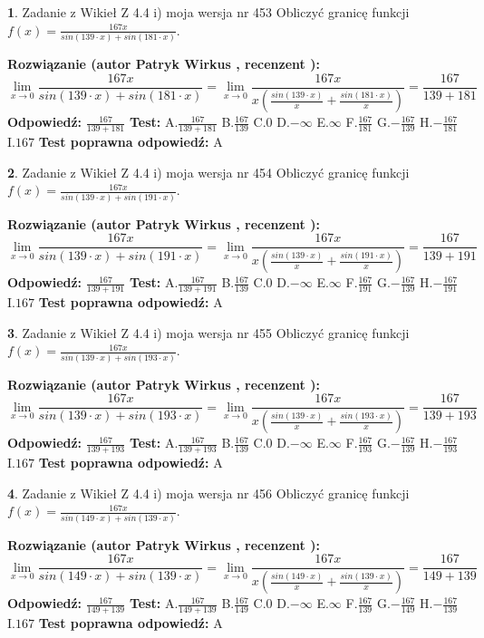 \documentclass[12pt, a4paper]{article}
\theoremstyle{definition} %
\newtheorem{zad}{}
\newcommand{\zadStart}[1]{\begin{zad}#1\newline}
\newcommand{\zadStop}{\end{zad}}
\newcommand{\rozwStart}[2]{\noindent \textbf{Rozwiązanie (autor #1 , recenzent #2): }\newline}
\newcommand{\rozwStop}{\newline}
\newcommand{\odpStart}{\noindent \textbf{Odpowiedź:}\newline}
\newcommand{\odpStop}{\newline}
\newcommand{\testStart}{\noindent \textbf{Test:}\newline}
\newcommand{\testStop}{\newline}
\newcommand{\kluczStart}{\noindent \textbf{Test poprawna odpowiedź:}\newline}
\newcommand{\kluczStop}{\newline}
\begin{document}
\zadStart{Zadanie z Wikieł Z 4.4 i) moja wersja nr 453}
Obliczyć granicę funkcji $f(x)=\frac{167x}{sin(139\cdot x) +sin(181\cdot x)}$.
\zadStop
\rozwStart{Patryk Wirkus}{}
$$\lim\limits_{x\to 0}\frac{167x}{sin(139\cdot x) +sin(181\cdot x)}=\lim\limits_{x\to 0}\frac{167x}{x(\frac{sin(139\cdot x)}{x}+\frac{sin(181\cdot x)}{x})}=\frac{167}{139+181}$$
\rozwStop
\odpStart
$\frac{167}{139+181}$
\odpStop
\testStart
A.$\frac{167}{139+181}$
B.$\frac{167}{139}$
C.$0$
D.$-\infty$
E.$\infty$
F.$\frac{167}{181}$
G.$-\frac{167}{139}$
H.$-\frac{167}{181}$
I.$167$
\testStop
\kluczStart
A
\kluczStop



\zadStart{Zadanie z Wikieł Z 4.4 i) moja wersja nr 454}
Obliczyć granicę funkcji $f(x)=\frac{167x}{sin(139\cdot x) +sin(191\cdot x)}$.
\zadStop
\rozwStart{Patryk Wirkus}{}
$$\lim\limits_{x\to 0}\frac{167x}{sin(139\cdot x) +sin(191\cdot x)}=\lim\limits_{x\to 0}\frac{167x}{x(\frac{sin(139\cdot x)}{x}+\frac{sin(191\cdot x)}{x})}=\frac{167}{139+191}$$
\rozwStop
\odpStart
$\frac{167}{139+191}$
\odpStop
\testStart
A.$\frac{167}{139+191}$
B.$\frac{167}{139}$
C.$0$
D.$-\infty$
E.$\infty$
F.$\frac{167}{191}$
G.$-\frac{167}{139}$
H.$-\frac{167}{191}$
I.$167$
\testStop
\kluczStart
A
\kluczStop



\zadStart{Zadanie z Wikieł Z 4.4 i) moja wersja nr 455}
Obliczyć granicę funkcji $f(x)=\frac{167x}{sin(139\cdot x) +sin(193\cdot x)}$.
\zadStop
\rozwStart{Patryk Wirkus}{}
$$\lim\limits_{x\to 0}\frac{167x}{sin(139\cdot x) +sin(193\cdot x)}=\lim\limits_{x\to 0}\frac{167x}{x(\frac{sin(139\cdot x)}{x}+\frac{sin(193\cdot x)}{x})}=\frac{167}{139+193}$$
\rozwStop
\odpStart
$\frac{167}{139+193}$
\odpStop
\testStart
A.$\frac{167}{139+193}$
B.$\frac{167}{139}$
C.$0$
D.$-\infty$
E.$\infty$
F.$\frac{167}{193}$
G.$-\frac{167}{139}$
H.$-\frac{167}{193}$
I.$167$
\testStop
\kluczStart
A
\kluczStop



\zadStart{Zadanie z Wikieł Z 4.4 i) moja wersja nr 456}
Obliczyć granicę funkcji $f(x)=\frac{167x}{sin(149\cdot x) +sin(139\cdot x)}$.
\zadStop
\rozwStart{Patryk Wirkus}{}
$$\lim\limits_{x\to 0}\frac{167x}{sin(149\cdot x) +sin(139\cdot x)}=\lim\limits_{x\to 0}\frac{167x}{x(\frac{sin(149\cdot x)}{x}+\frac{sin(139\cdot x)}{x})}=\frac{167}{149+139}$$
\rozwStop
\odpStart
$\frac{167}{149+139}$
\odpStop
\testStart
A.$\frac{167}{149+139}$
B.$\frac{167}{149}$
C.$0$
D.$-\infty$
E.$\infty$
F.$\frac{167}{139}$
G.$-\frac{167}{149}$
H.$-\frac{167}{139}$
I.$167$
\testStop
\kluczStart
A
\kluczStop
\end{document}
